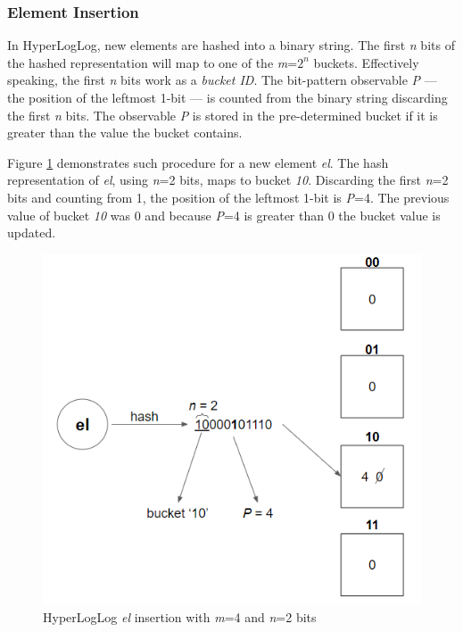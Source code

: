 \subsubsection*{Element Insertion}
In HyperLogLog, new elements are hashed into a binary string. The first \textit{n} bits of the hashed representation will map to one of the \textit{m}=$2^n$ buckets. Effectively speaking, the first \textit{n} bits work as a \textit{bucket ID}. The bit-pattern observable \textit{P} --- the position of the leftmost 1-bit --- is counted from the binary string discarding the first \textit{n} bits. The observable \textit{P} is stored in the pre-determined bucket if it is greater than the value the bucket contains. 

Figure \ref{fig:hll-insert} demonstrates such procedure for a new element \textit{el}. The hash representation of \textit{el}, using \textit{n}=2 bits, maps to bucket \textit{10}. Discarding the first \textit{n}=2 bits and counting from 1, the position of the leftmost 1-bit is \textit{P}=4. The previous value of bucket \textit{10} was 0 and because \textit{P}=4 is greater than 0 the bucket value is updated.


\begin{figure}[!htb]
    \begin{center}
      \includegraphics[scale=1]{figures/hll-insertion.png}
      \caption[HyperLogLog insertion]{HyperLogLog \textit{el} insertion with \textit{m}=4 and \textit{n}=2 bits}
      \label{fig:hll-insert}
    \end{center}
\end{figure}

